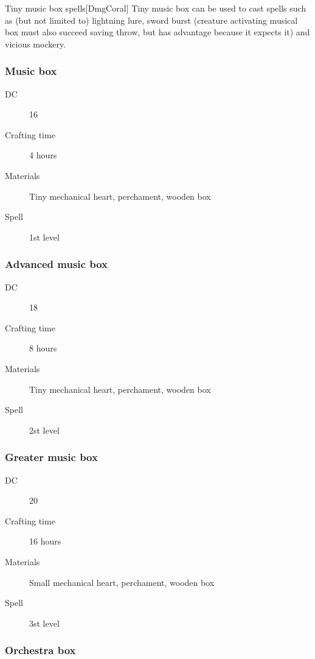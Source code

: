 \begin{commentbox}{Tiny music box spells}[DmgCoral]
Tiny music box can be used to cast spells such as (but not limited to) lightning lure, sword burst (creature activating musical box must also succeed saving throw, but has advantage because it expects it) and vicious mockery. 
\end{commentbox}

\subsubsection{Music box}

\begin{description}
\item [DC] 16 \arcana
\item [Crafting time] 4 hours
\item [Materials] Tiny mechanical heart, perchament, wooden box
\item [Spell] 1st level
\end{description}

\subsubsection{Advanced music box}

\begin{description}
\item [DC] 18 \arcana
\item [Crafting time] 8 hours
\item [Materials] Tiny mechanical heart, perchament, wooden box
\item [Spell] 2st level
\end{description}

\subsubsection{Greater music box}

\begin{description}
\item [DC] 20 \arcana
\item [Crafting time] 16 hours
\item [Materials] Small mechanical heart, perchament, wooden box
\item [Spell] 3st level
\end{description}

\subsubsection{Orchestra box}

